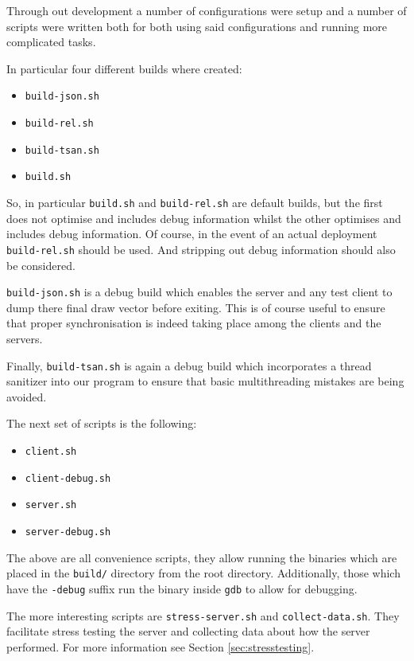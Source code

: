 \documentclass[article]{uom-coursework}
\begin{document}
Through out development a number of configurations were setup
and a number of scripts were written both for both using said
configurations and running more complicated tasks.

In particular four different builds where created:

\begin{itemize}
    \item \texttt{build-json.sh}
    \item \texttt{build-rel.sh}
    \item \texttt{build-tsan.sh}
    \item \texttt{build.sh}
\end{itemize}

So, in particular \texttt{build.sh} and \texttt{build-rel.sh}
are default builds, but the first does not optimise and includes
debug information whilst the other optimises and includes debug
information. Of course, in the event of an actual deployment
\texttt{build-rel.sh} should be used. And stripping out debug
information should also be considered.

\texttt{build-json.sh} is a debug build which enables the server
and any test client to dump there final draw vector before
exiting. This is of course useful to ensure that proper
synchronisation is indeed taking place among the clients and the
servers.

Finally, \texttt{build-tsan.sh} is again a debug build which
incorporates a thread sanitizer into our program to ensure that
basic multithreading mistakes are being avoided.

The next set of scripts is the following:

\begin{itemize}
    \item \texttt{client.sh}
    \item \texttt{client-debug.sh}
    \item \texttt{server.sh}
    \item \texttt{server-debug.sh}
\end{itemize}

The above are all convenience scripts, they allow running the
binaries which are placed in the \texttt{build/} directory from
the root directory. Additionally, those which have the
\texttt{-debug} suffix run the binary inside \texttt{gdb} to
allow for debugging.

The more interesting scripts are \texttt{stress-server.sh} and
\texttt{collect-data.sh}. They facilitate stress testing the
server and collecting data about how the server performed. For
more information see Section \ref{sec:stresstesting}.
\end{document}
